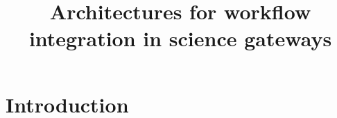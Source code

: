 \documentclass[preprint,3p,twocolumn]{elsarticle}
\begin{document}
\begin{frontmatter}



\title{Architectures for workflow integration in science gateways}


\author{}

\address{}

\begin{abstract}

\end{abstract}

\begin{keyword}



\end{keyword}

\end{frontmatter}


\maketitle

\section{Introduction}
\end{document}
